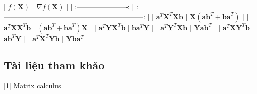 | $f(\mathbf{X}) $                                   | $ \nabla f(\mathbf{X}) $                                   | 
| :----------------------:                               | :------------------------------------------------------------: | 
| $ \mathbf{a}^T \mathbf{X}^T \mathbf{Xb}$           | $ \mathbf{X}(\mathbf{ab}^T + \mathbf{ba}^T)        $       | 
| $ \mathbf{a}^T \mathbf{X} \mathbf{X}^T \mathbf{b}$ | $ (\mathbf{ab}^T + \mathbf{ba}^T)\mathbf{X}        $       | 
| $ \mathbf{a}^T \mathbf{Y} \mathbf{X}^T \mathbf{b}$ | $ \mathbf{b}\mathbf{a}^T \mathbf{Y}        $               | 
| $ \mathbf{a}^T \mathbf{Y}^T \mathbf{X} \mathbf{b}$ | $ \mathbf{Y}\mathbf{a}\mathbf{b}^T         $               | 
| $ \mathbf{a}^T \mathbf{X} \mathbf{Y}^T \mathbf{b}$ | $ \mathbf{a}\mathbf{b}^T\mathbf{Y}         $               | 
| $ \mathbf{a}^T \mathbf{X}^T \mathbf{Y} \mathbf{b}$ | $ \mathbf{Y}\mathbf{b}\mathbf{a}^T         $               | 
 
 
\subsection{Tài liệu tham khảo }
[1] \href{https://ccrma.stanford.edu/~dattorro/matrixcalc.pdf}{Matrix calculus} 
 
 
 
